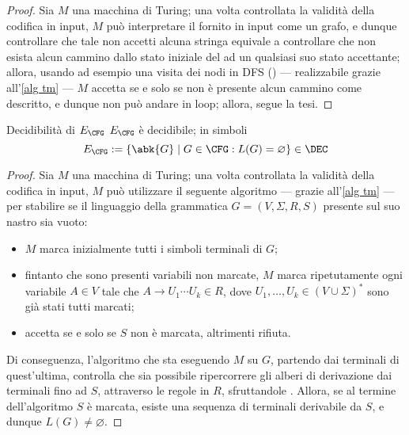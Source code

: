 \documentclass[a4paper, 12pt]{report}
\begin{document}
    \begin{proof}
        Sia $M$ una macchina di Turing; una volta controllata la validità della codifica in input, $M$ può interpretare il \DFA fornito in input come un grafo, e dunque controllare che tale \DFA non accetti alcuna stringa equivale a controllare che non esista alcun cammino dallo stato iniziale del \DFA ad un qualsiasi suo stato accettante; allora, usando ad esempio una visita dei nodi in DFS () --- realizzabile grazie all'\cref{alg tm} --- $M$ accetta se e solo se non è presente alcun cammino come descritto, e dunque non può andare in loop; allora, segue la tesi.
    \end{proof}

    \begin{framedthm}{Decidibilità di $E_\CFG$}
        $E_\CFG$ è decidibile; in simboli $$E_\CFG := \{\abk{G} \mid G \in \CFG: L(G) = \varnothing \} \in \DEC$$
    \end{framedthm}

    \begin{proof}
        Sia $M$ una macchina di Turing; una volta controllata la validità della codifica in input, $M$ può utilizzare il seguente algoritmo --- grazie all'\cref{alg tm} --- per stabilire se il linguaggio della grammatica $G = (V, \Sigma, R, S)$ presente sul suo nastro sia vuoto:

        \begin{itemize}
            \item $M$ marca inizialmente tutti i simboli terminali di $G$;
            \item fintanto che sono presenti variabili non marcate, $M$ marca ripetutamente ogni variabile $A \in V$ tale che $A \to U_1 \cdots U_k \in R$, dove $U_1, \ldots, U_k \in (V \cup \Sigma)^*$ sono già stati tutti marcati;
            \item accetta se e solo se $S$ non è marcata, altrimenti rifiuta.
        \end{itemize}

        Di conseguenza, l'algoritmo che sta eseguendo $M$ su $G$, partendo dai terminali di quest'ultima, controlla che sia possibile ripercorrere gli alberi di derivazione dai terminali fino ad $S$, attraverso le regole in $R$, sfruttandole . Allora, se al termine dell'algoritmo $S$ è marcata, esiste una sequenza di terminali derivabile da $S$, e dunque $L(G) \neq \varnothing$.
    \end{proof}
\end{document}
